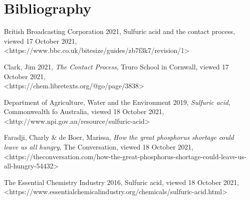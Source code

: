 \documentclass[12pt, a4paper]{article}
\begin{document}
\pagebreak

\section{Bibliography}

British Broadcasting Corporation 2021, Sulfuric acid and the contact process, viewed 17 October 2021, \\ \textless{https://www.bbc.co.uk/bitesize/guides/zb7f3k7/revision/1}\textgreater

Clark, Jim 2021, \emph{The Contact Process}, Truro School in Cornwall, viewed 17 October 2021, \\ \textless{https://chem.libretexts.org/@go/page/3838}\textgreater

Department of Agriculture, Water and the Environment 2019, \emph{Sulfuric acid}, Commonwealth fo Australia, viewed 18 October 2021, \textless{http://www.npi.gov.au/resource/sulfuric-acid}\textgreater

Faradji, Charly & de Boer, Marissa, \emph{How the great phosphorus shortage could leave us all hungry}, The Conversation, viewed 18 October 2021, \\ \textless{https://theconversation.com/how-the-great-phosphorus-shortage-could-leave-us-all-hungry-54432}\textgreater

The Essential Chemistry Industry 2016, Sulfuric acid, viewed 18 October 2021, \\ \textless{https://www.essentialchemicalindustry.org/chemicals/sulfuric-acid.html}\textgreater
\end{document}
